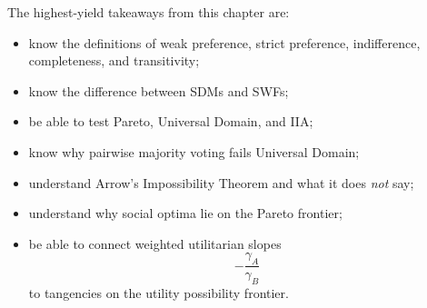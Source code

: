\begin{examtip}
The highest-yield takeaways from this chapter are:
\begin{itemize}
    \item know the definitions of weak preference, strict preference, indifference, completeness, and transitivity;
    \item know the difference between SDMs and SWFs;
    \item be able to test Pareto, Universal Domain, and IIA;
    \item know why pairwise majority voting fails Universal Domain;
    \item understand Arrow's Impossibility Theorem and what it does \emph{not} say;
    \item understand why social optima lie on the Pareto frontier;
    \item be able to connect weighted utilitarian slopes
    \[
    -\frac{\gamma_A}{\gamma_B}
    \]
    to tangencies on the utility possibility frontier.
\end{itemize}
\end{examtip}